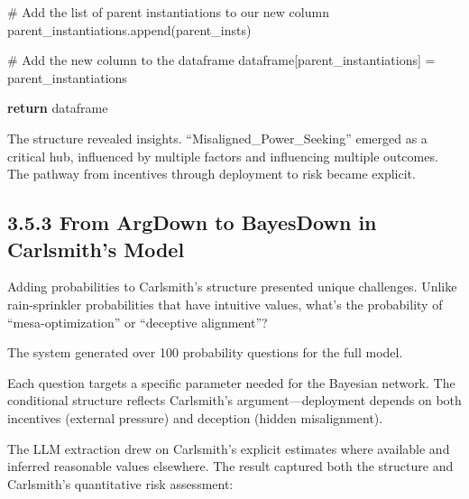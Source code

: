 \documentclass[
  11pt,
  letterpaper,
]{book}
\newenvironment{Shaded}{\begin{snugshade}}{\end{snugshade}}
\newcommand{\CommentTok}[1]{\textcolor[rgb]{0.37,0.37,0.37}{#1}}
\newcommand{\ControlFlowTok}[1]{\textcolor[rgb]{0.00,0.23,0.31}{\textbf{#1}}}
\newcommand{\NormalTok}[1]{\textcolor[rgb]{0.00,0.23,0.31}{#1}}
\newcommand{\OperatorTok}[1]{\textcolor[rgb]{0.37,0.37,0.37}{#1}}
\newcommand{\StringTok}[1]{\textcolor[rgb]{0.13,0.47,0.30}{#1}}
\begin{document}
\begin{landscape}
\begin{Shaded}
\begin{Highlighting}[]
        \CommentTok{\# Add the list of parent instantiations to our new column}
\NormalTok{        parent\_instantiations.append(parent\_insts)}

    \CommentTok{\# Add the new column to the dataframe}
\NormalTok{    dataframe[}\StringTok{\textquotesingle{}parent\_instantiations\textquotesingle{}}\NormalTok{] }\OperatorTok{=}\NormalTok{ parent\_instantiations}

    \ControlFlowTok{return}\NormalTok{ dataframe}
\end{Highlighting}
\end{Shaded}

The structure revealed insights. ``Misaligned\_Power\_Seeking'' emerged
as a critical hub, influenced by multiple factors and influencing
multiple outcomes. The pathway from incentives through deployment to
risk became explicit.

\subsection{3.5.3 From ArgDown to BayesDown in Carlsmith's
Model}\label{sec-carlsmith-bayesdown}

Adding probabilities to Carlsmith's structure presented unique
challenges. Unlike rain-sprinkler probabilities that have intuitive
values, what's the probability of ``mesa-optimization'' or ``deceptive
alignment''?

The system generated over 100 probability questions for the full model.

Each question targets a specific parameter needed for the Bayesian
network. The conditional structure reflects Carlsmith's
argument---deployment depends on both incentives (external pressure) and
deception (hidden misalignment).

The LLM extraction drew on Carlsmith's explicit estimates where
available and inferred reasonable values elsewhere. The result captured
both the structure and Carlsmith's quantitative risk assessment:


\end{landscape}
\end{document}
